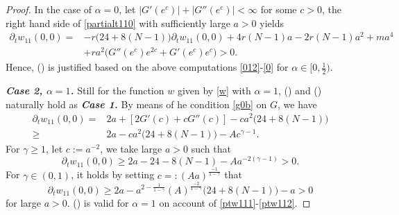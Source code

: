 \documentclass[10pt,a4paper]{amsart}
\begin{document}
\begin{proof}
 In the case of $\alpha=0$, let $|G'(e^c)|+|G''(e^c)|<\infty$ for some $c>0$,  the right hand side of \eqref{partialt110} with sufficiently large $a>0$ yields
\begin{equation}\label{0}
\begin{aligned}
\partial_t w_{11}(0,0)=&-r\big(24+8(N-1)\big)\partial_t w_{11}(0,0)+4r(N-1)a-2r(N-1)a^2+ma^4\\
&+ra^2\big(G''(e^c)e^{2c}+G'(e^c)e^c\big)>0.
\end{aligned}
 \end{equation}
Hence,  (\expandafter{}) is justified based on the above computations \eqref{012}-\eqref{0} for $\alpha\in[0,\frac{1}{2})$.

\noindent\textbf{\emph{Case 2, $\alpha=1$.}} Still for the function $w$  given by \eqref{w} with $\alpha=1$, (\expandafter{}) and (\expandafter{}) naturally hold as \textbf{\emph{Case 1.}}
By means of he condition \eqref{g0b} on $G$, we have 
\[\begin{aligned}
\partial_t w_{11}(0,0)=&2a+[2G'(c)+cG''(c)]-ca^2\big(24+8(N-1)\big)\\
\geq &2a-ca^2\big(24+8(N-1)\big)-Ac^{\gamma-1}.
\end{aligned}\]
 For $\gamma\geq 1$, let $c:=a^{-2}$, we take large $a>0$ such that 
\begin{equation}\label{ptw111}\partial_t w_{11}(0,0)\geq 2a-24-8(N-1)-Aa^{-2(\gamma-1)}>0.\end{equation}
For $\gamma\in(0,1)$, it holds by setting $c=:(Aa)^{\frac{-1}{1-\gamma}}$ that 
\begin{equation}\label{ptw112}\partial_t w_{11}(0,0)\geq2a-a^{2-\frac{1}{1-\gamma}}(A)^{\frac{-2}{1-\gamma}}\big(24+8(N-1)\big)-a>0 \end{equation}
for large $a>0$. (\expandafter{}) is valid for $\alpha=1$ on account of \eqref{ptw111}-\eqref{ptw112}.















\vspace{2mm}


\end{proof}
\end{document}
